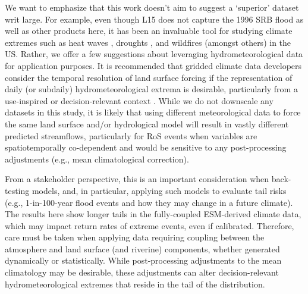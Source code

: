 \documentclass[nhess, manuscript]{copernicus}
\begin{document}
We want to emphasize that this work doesn't aim to suggest a `superior' dataset writ large. For example, even though L15 does not capture the 1996 SRB flood as well as other products here, it has been an invaluable tool for studying climate extremes such as heat waves \citep{mazdiyasni2015substantial}, droughts \citep{pendergrass2020flash,williams2020large}, and wildfires \citep{williams2019observed} (amongst others) in the US.
Rather, we offer a few suggestions about leveraging hydrometeorological data for application purposes.
It is recommended that gridded climate data developers consider the temporal resolution of land surface forcing if the representation of daily (or subdaily) hydrometeorological extrema is desirable, particularly from a use-inspired or decision-relevant context \citep{Jagannathan2021}.
While we do not downscale any datasets in this study, it is likely that using different meteorological data to force the same land surface and/or hydrological model will result in vastly different predicted streamflows, particularly for RoS events when variables are spatiotemporally co-dependent and would be sensitive to any post-processing adjustments (e.g., mean climatological correction).

From a stakeholder perspective, this is an important consideration when back-testing models, and, in particular, applying such models to evaluate tail risks (e.g., 1-in-100-year flood events and how they may change in a future climate).
The results here show longer tails in the fully-coupled ESM-derived climate data, which may impact return rates of extreme events, even if calibrated.
Therefore, care must be taken when applying data requiring coupling between the atmosphere and land surface (and riverine) components, whether generated dynamically or statistically.
While post-processing adjustments to the mean climatology may be desirable, these adjustments can alter decision-relevant hydrometeorological extremes that reside in the tail of the distribution.




\end{document}

